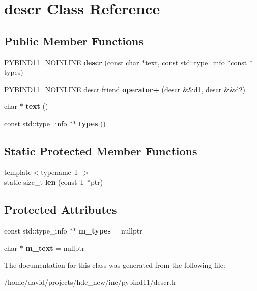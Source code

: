 \hypertarget{classdescr}{}\section{descr Class Reference}
\label{classdescr}
\subsection*{Public Member Functions}
\begin{DoxyCompactItemize}
\item 
P\+Y\+B\+I\+N\+D11\+\_\+\+N\+O\+I\+N\+L\+I\+NE {\bfseries descr} (const char $\ast$text, const std\+::type\+\_\+info $\ast$const $\ast$types)\hypertarget{classdescr_a845eb2b8fc60b3b1f0e1c6c58e6f5052}{}\label{classdescr_a845eb2b8fc60b3b1f0e1c6c58e6f5052}

\item 
P\+Y\+B\+I\+N\+D11\+\_\+\+N\+O\+I\+N\+L\+I\+NE \hyperlink{classdescr}{descr} friend {\bfseries operator+} (\hyperlink{classdescr}{descr} \&\&d1, \hyperlink{classdescr}{descr} \&\&d2)\hypertarget{classdescr_a6a96c83e20b46d70809b7c7827383434}{}\label{classdescr_a6a96c83e20b46d70809b7c7827383434}

\item 
char $\ast$ {\bfseries text} ()\hypertarget{classdescr_adc77e1b6809990f793e2af6d0e95f415}{}\label{classdescr_adc77e1b6809990f793e2af6d0e95f415}

\item 
const std\+::type\+\_\+info $\ast$$\ast$ {\bfseries types} ()\hypertarget{classdescr_a876b6bd5a93f1e245d3ab3d354087b6e}{}\label{classdescr_a876b6bd5a93f1e245d3ab3d354087b6e}

\end{DoxyCompactItemize}
\subsection*{Static Protected Member Functions}
\begin{DoxyCompactItemize}
\item 
{\footnotesize template$<$typename T $>$ }\\static size\+\_\+t {\bfseries len} (const T $\ast$ptr)\hypertarget{classdescr_a813f9b44acf23c32a336f205280e75b3}{}\label{classdescr_a813f9b44acf23c32a336f205280e75b3}

\end{DoxyCompactItemize}
\subsection*{Protected Attributes}
\begin{DoxyCompactItemize}
\item 
const std\+::type\+\_\+info $\ast$$\ast$ {\bfseries m\+\_\+types} = nullptr\hypertarget{classdescr_ad6dd609de8401ec9e366e20ffe95d0aa}{}\label{classdescr_ad6dd609de8401ec9e366e20ffe95d0aa}

\item 
char $\ast$ {\bfseries m\+\_\+text} = nullptr\hypertarget{classdescr_aadd18554363bc5427add3d26f2f1bf83}{}\label{classdescr_aadd18554363bc5427add3d26f2f1bf83}

\end{DoxyCompactItemize}


The documentation for this class was generated from the following file\+:\begin{DoxyCompactItemize}
\item 
/home/david/projects/hdc\+\_\+new/inc/pybind11/descr.\+h\end{DoxyCompactItemize}
